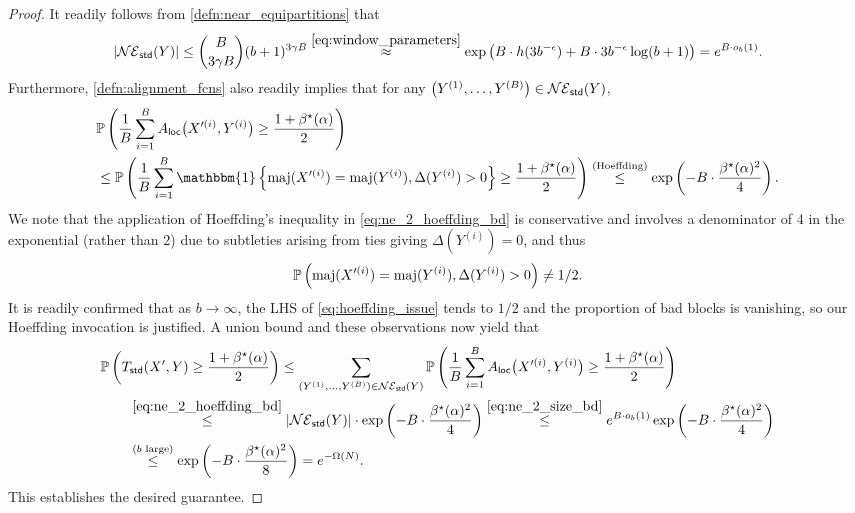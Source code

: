 \documentclass[11pt]{amsart}
\numberwithin{equation}{section}
\numberwithin{equation}{section}
\newcommand{\1}{\mathbbm{1}}
\newcommand{\Prob}{\mathbb{P}}
\newcommand{\maj}{\textup{maj}}
\newcommand{\std}{\textup{\textsf{std}}}
\newcommand{\loc}{\textup{\textsf{loc}}}
\theoremstyle{definition}
\begin{document}
\begin{proof}
    It readily follows from \cref{defn:near_equipartitions} that
    \begin{align} \label{eq:ne_2_size_bd}
        \left|\mathcal{NE}_\std\!\left( Y \right) \right| \leq \binom{B}{3\gamma B} (b+1)^{3\gamma B} \stackrel{\eqref{eq:window_parameters}}{\approx} \exp\left( B \cdot h(3b^{-\epsilon}) + B \cdot 3b^{-\epsilon} \log (b+1) \right) = e^{B \cdot o_b(1)}.
    \end{align}
    Furthermore, \cref{defn:alignment_fcns} also readily implies that for any $\big(Y^{(1)}, \dots, Y^{(B)}\big) \in \mathcal{NE}_\std(Y)$,
    \begin{align}
        & \Prob\left( \frac{1}{B} \sum_{i=1}^B A_\loc\big( X'^{(i)}, Y^{(i)} \big) \geq \frac{1+\beta^\star(\alpha)}{2} \right) \nonumber \\
        & \leq \Prob\left( \frac{1}{B} \sum_{i=1}^B \1\left\{\maj(X'^{(i)}) = \maj(Y^{(i)}), \Delta(Y^{(i)}) > 0 \right\} \geq \frac{1+\beta^\star(\alpha)}{2} \right) \stackrel{\text{(Hoeffding)}}{\leq} \exp\left( - B \cdot \frac{\beta^\star(\alpha)^2}{4} \right). \label{eq:ne_2_hoeffding_bd}
    \end{align}
    We note that the application of Hoeffding's inequality in \eqref{eq:ne_2_hoeffding_bd} is conservative and involves a denominator of $4$ in the exponential (rather than $2$) due to subtleties arising from ties giving $\Delta(Y^{(i)}) = 0$, and thus
    \begin{align} \label{eq:hoeffding_issue}
        \Prob\left( \maj(X'^{(i)}) = \maj(Y^{(i)}), \Delta(Y^{(i)}) > 0 \right) \neq 1/2.
    \end{align}
    It is readily confirmed that as $b \to \infty$, the LHS of \eqref{eq:hoeffding_issue} tends to $1/2$ and the proportion of bad blocks is vanishing, so our Hoeffding invocation is justified. A union bound and these observations now yield that
    \begin{align}
        & \Prob\left( T_\std\!\left( X', Y \right) \geq \frac{1+\beta^\star(\alpha)}{2} \right) \leq \sum_{(Y^{(1)}, \dots, Y^{(B)}) \in \mathcal{NE}_\std(Y)} \Prob\left( \frac{1}{B} \sum_{i=1}^B A_\loc\big( X'^{(i)}, Y^{(i)} \big) \geq \frac{1+\beta^\star(\alpha)}{2} \right) \nonumber \\
        & \qquad \stackrel{ \eqref{eq:ne_2_hoeffding_bd}}{\leq} \left|\mathcal{NE}_\std\!\left( Y \right) \right| \cdot \exp\left( - B \cdot \frac{\beta^\star(\alpha)^2}{4} \right) \stackrel{\eqref{eq:ne_2_size_bd}}{\leq } e^{B \cdot o_b(1)} \exp\left( - B \cdot \frac{\beta^\star(\alpha)^2}{4} \right) \nonumber \\
        & \qquad \stackrel{\text{($b$ large)}}{\leq} \exp\left( - B \cdot \frac{\beta^\star(\alpha)^2}{8} \right) = e^{-\Omega(N)}. \label{eq:ne_2_exp_bd}
    \end{align}
    This establishes the desired guarantee.
\end{proof}
\end{document}
